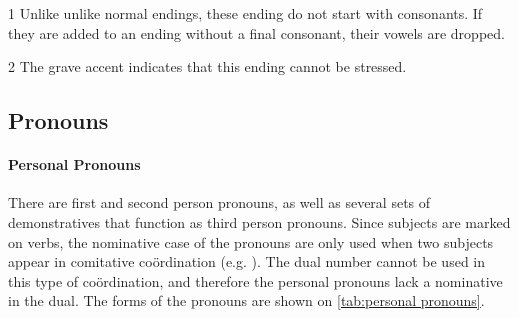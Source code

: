 \begin{table}[h]
\centering
\caption{Noun Endings}
\label{tab:noun endings}
\begin{threeparttable}
\begin{tablenotes}
\item[1] Unlike unlike normal endings, these ending do not start with
    consonants. If they are added to an ending without a final consonant, their
    vowels are dropped.
\item[2] The grave accent indicates that this ending cannot be stressed.
\end{tablenotes}
\end{threeparttable}
\end{table}

\subsection{Pronouns}
\paragraph{Personal Pronouns}
There are first and second person pronouns, as well as several sets of
demonstratives that function as third person pronouns.
Since subjects are marked on verbs, the nominative case of the pronouns are
only used when two subjects appear in comitative coördination (e.g. ).
The dual number cannot be used in this type of coördination, and therefore the
personal pronouns lack a nominative in the dual.
The forms of the pronouns are shown on \cref{tab:personal pronouns}.

